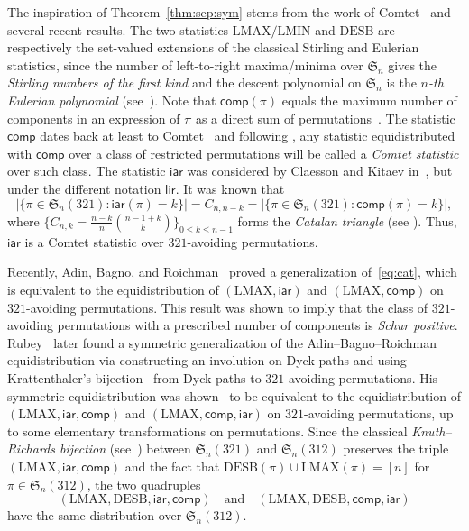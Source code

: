 \documentclass[12pt]{amsart}
\numberwithin{equation}{section}
\theoremstyle{plain}
\theoremstyle{definition}
\def\S{\mathfrak{S}}
\def\iar{\mathsf{iar}}
\def\lir{\mathsf{lir}}
\def\comp{\mathsf{comp}}
\def\LMAX{\mathrm{LMAX}}
\def\LMIN{\mathrm{LMIN}}
\def\LMIN{\mathrm{LMIN}}
\def\DESB{\mathrm{DESB}}
\def\DESB{\mathrm{DESB}}
\begin{document}
The inspiration of Theorem~\ref{thm:sep:sym} stems from the work of Comtet~\cite[Ex.~VI.14]{com} and several recent results. The two statistics $\LMAX/\LMIN$ and $\DESB$ are respectively the set-valued extensions of the classical Stirling and Eulerian statistics, since the number of left-to-right maxima/minima over $\S_n$ gives the {\em Stirling numbers of the first kind} and  the descent polynomial on $\S_n$ is the {\em$n$-th Eulerian polynomial} (see~\cite{bon,FS,pet}). Note that  $\comp(\pi)$ equals the maximum number of components in an expression of $\pi$ as a direct sum of permutations~\cite{adin}. The statistic $\comp$ dates back at least to Comtet~\cite[Ex.~VI.14]{com} and following \cite{flw}, any statistic equidistributed with $\comp$ over a class of restricted permutations will be called a {\em Comtet statistic} over such class. The statistic $\iar$ was considered by Claesson and Kitaev in~\cite{CK}, but under the different notation $\lir$. It was known that 
 \begin{equation}\label{eq:cat}
 |\{\pi\in\S_n(321): \iar(\pi)=k\}|=C_{n,n-k}= |\{\pi\in\S_n(321): \comp(\pi)=k\}|,
 \end{equation}
 where $\{C_{n,k}=\frac{n-k}{n}\binom{n-1+k}{k}\}_{0\le k\le n-1}$ forms the {\em Catalan triangle} (see \cite[A009766]{oeis}). Thus, $\iar$ is a Comtet statistic over $321$-avoiding permutations. 
 
 Recently, Adin, Bagno, and Roichman~\cite{adin} proved a generalization of~\eqref{eq:cat}, which is equivalent to the equidistribution of $(\LMAX,\iar)$ and $(\LMAX,\comp)$ on $321$-avoiding permutations. This result was shown to imply that the class of $321$-avoiding permutations with a prescribed number of components is {\em Schur positive}. Rubey~\cite{rub} later found a symmetric generalization of the Adin--Bagno--Roichman equidistribution via constructing an involution on Dyck paths and using Krattenthaler's bijection~\cite{kra} from Dyck paths to $321$-avoiding permutations. His symmetric equidistribution was shown~\cite{flw} to be equivalent to  the equidistribution of $(\LMAX,\iar,\comp)$ and $(\LMAX,\comp,\iar)$ on $321$-avoiding permutations, up to some elementary transformations on permutations. Since the classical {\em Knuth--Richards bijection} (see~\cite{CK}) between $\S_n(321)$ and $\S_n(312)$ preserves the triple $(\LMAX,\iar,\comp)$ and the fact that $\DESB(\pi)\cup\LMAX(\pi)=[n]$ for $\pi\in\S_n(312)$, the two quadruples 
 $$
 (\LMAX,\DESB,\iar,\comp)\quad \text{and}\quad (\LMAX,\DESB,\comp,\iar)
 $$
 have the same distribution over $\S_n(312)$. 
 
\end{document}
